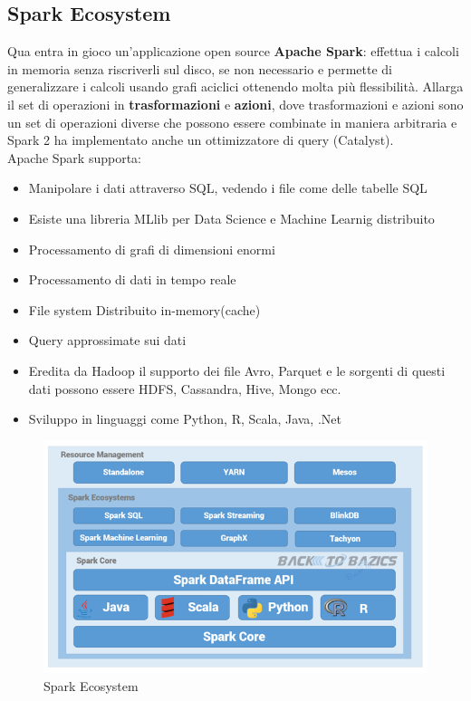 \documentclass[11pt, twocolumn]{article}
\newenvironment{myitemize}
{ \begin{itemize}[topsep=0ex]
		\setlength{\itemsep}{0pt}
		\setlength{\parskip}{0pt}
		\setlength{\parsep}{0pt}     }
	{ \end{itemize}                  }
\begin{document}
\subsection{Spark Ecosystem}
Qua entra in gioco un'applicazione open source \textbf{Apache Spark}: effettua i calcoli in memoria senza riscriverli sul disco, se non necessario e permette di generalizzare i calcoli usando grafi aciclici ottenendo molta più flessibilità. Allarga il set di operazioni in \textbf{trasformazioni} e \textbf{azioni}, dove trasformazioni e azioni sono un set di operazioni diverse che possono essere combinate in maniera arbitraria e Spark 2 ha implementato anche un ottimizzatore di query (Catalyst). \\
Apache Spark supporta:
\begin{myitemize}
	\item Manipolare i dati attraverso SQL, vedendo i file come delle tabelle SQL
	\item Esiste una libreria MLlib per Data Science e Machine Learnig distribuito
	\item Processamento di grafi di dimensioni enormi 
	\item Processamento di dati in tempo reale
	\item File system Distribuito in-memory(cache)
	\item Query approssimate sui dati
	\item Eredita da Hadoop il supporto dei file Avro, Parquet e le sorgenti di questi dati possono essere HDFS, Cassandra, Hive, Mongo ecc.
	\item Sviluppo in linguaggi come Python, R, Scala, Java, .Net
\end{myitemize}
\begin{figure}
	\centering
	\includegraphics[width=\linewidth]{imgs/Spark_eco.png}
	\caption{Spark Ecosystem}
	\label{fig:SparkEco}
\end{figure}
\end{document}
